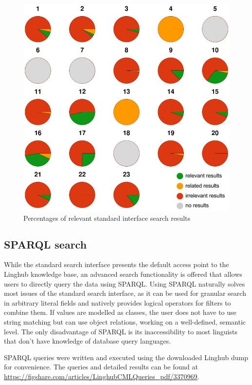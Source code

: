 \documentclass[smallextended]{svjour3}       %
\begin{document}
\begin{figure}
    \includegraphics[width=\textwidth]{img/eval_rel_interface.png}
    \caption{\label{fig:freetext-rel} Percentages of relevant standard interface
    search results}
\end{figure}

\subsection{SPARQL search}

While the standard search interface presents the default access point to the
Linghub knowledge base, an advanced search functionality is offered that allows
users to directly query the data using SPARQL.  Using
SPARQL naturally solves most issues of the standard search interface, as it can
be used for granular search in arbitrary literal fields and natively provides
logical operators for filters to combine them. If values are modelled as
classes, the user does not have to use string matching but can use object
relations, working on a well-defined, semantic level. The only disadvantage of
SPARQL is its inaccessibility to most linguists that don't have knowledge
of database query languages.  

SPARQL queries were written and executed using the downloaded Linghub dump for
convenience. The queries and detailed results can be found at
\url{https://figshare.com/articles/LinghubCMLQueries_pdf/3370969}.
\end{document}
